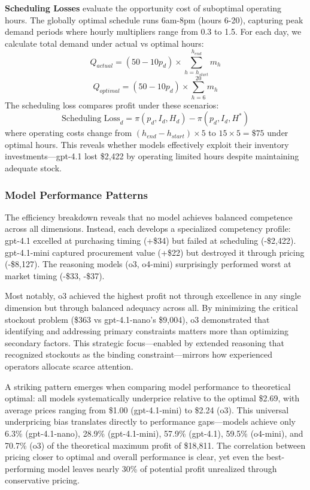 \documentclass[11pt]{article}
\begin{document}
\textbf{Scheduling Losses} evaluate the opportunity cost of suboptimal operating hours. The globally optimal schedule runs 6am-8pm (hours 6-20), capturing peak demand periods where hourly multipliers range from 0.3 to 1.5. For each day, we calculate total demand under actual vs optimal hours:
$$Q_{actual} = (50 - 10p_d) \times \sum_{h=h_{start}}^{h_{end}} m_h$$
$$Q_{optimal} = (50 - 10p_d) \times \sum_{h=6}^{20} m_h$$
The scheduling loss compares profit under these scenarios:
$$\text{Scheduling Loss}_d = \pi(p_d, I_d, H_d) - \pi(p_d, I_d, H^*)$$
where operating costs change from $(h_{end} - h_{start}) \times 5$ to $15 \times 5 = \$75$ under optimal hours. This reveals whether models effectively exploit their inventory investments—gpt-4.1 lost \$2,422 by operating limited hours despite maintaining adequate stock.

\subsubsection{Model Performance Patterns}

The efficiency breakdown reveals that no model achieves balanced competence across all dimensions.
Instead, each develops a specialized competency profile: gpt-4.1 excelled at purchasing timing (+\$34) but failed at scheduling (-\$2,422).
gpt-4.1-mini captured procurement value (+\$22) but destroyed it through pricing (-\$8,127).
The reasoning models (o3, o4-mini) surprisingly performed worst at market timing (-\$33, -\$37).

Most notably, o3 achieved the highest profit not through excellence in any single dimension but through balanced adequacy across all.
By minimizing the critical stockout problem (\$363 vs gpt-4.1-nano's \$9,004), o3 demonstrated that identifying and addressing primary constraints matters more than optimizing secondary factors.
This strategic focus—enabled by extended reasoning that recognized stockouts as the binding constraint—mirrors how experienced operators allocate scarce attention.

A striking pattern emerges when comparing model performance to theoretical optimal: all models systematically underprice relative to the optimal \$2.69, with average prices ranging from \$1.00 (gpt-4.1-mini) to \$2.24 (o3).
This universal underpricing bias translates directly to performance gaps—models achieve only 6.3\% (gpt-4.1-nano), 28.9\% (gpt-4.1-mini), 57.9\% (gpt-4.1), 59.5\% (o4-mini), and 70.7\% (o3) of the theoretical maximum profit of \$18,811.
The correlation between pricing closer to optimal and overall performance is clear, yet even the best-performing model leaves nearly 30\% of potential profit unrealized through conservative pricing.
\end{document}
